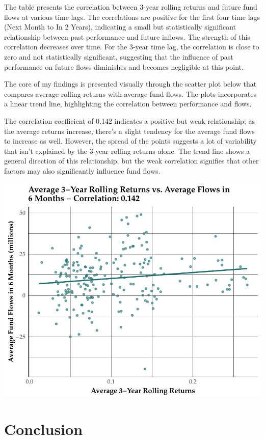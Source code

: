 \documentclass[11pt,preprint, authoryear]{elsarticle}
\numberwithin{equation}{section}
\numberwithin{figure}{section}
\numberwithin{table}{section}
\begin{document}
The table presents the correlation between 3-year rolling returns and
future fund flows at various time lags. The correlations are positive
for the first four time lags (Next Month to In 2 Years), indicating a
small but statistically significant relationship between past
performance and future inflows. The strength of this correlation
decreases over time. For the 3-year time lag, the correlation is close
to zero and not statistically significant, suggesting that the influence
of past performance on future flows diminishes and becomes negligible at
this point.

The core of my findings is presented visually through the scatter plot
below that compares average rolling returns with average fund flows. The
plots incorporates a linear trend line, highlighting the correlation
between performance and flows.

The correlation coefficient of 0.142 indicates a positive but weak
relationship; as the average returns increase, there's a slight tendency
for the average fund flows to increase as well. However, the spread of
the points suggests a lot of variability that isn't explained by the
3-year rolling returns alone. The trend line shows a general direction
of this relationship, but the weak correlation signifies that other
factors may also significantly influence fund flows.

\includegraphics{Question-4_files/figure-latex/unnamed-chunk-4-1.pdf}

\hypertarget{conclusion}{%
\section{Conclusion}\label{conclusion}}
\end{document}
